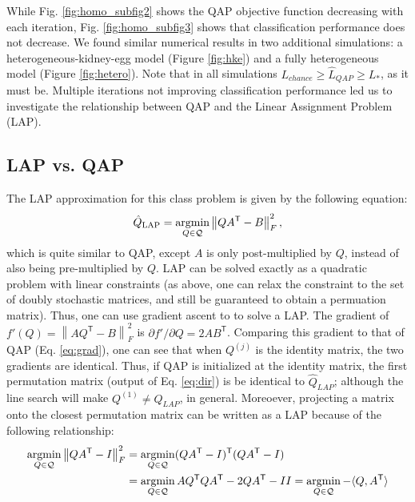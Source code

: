 \documentclass{article} %
\providecommand{\norm}[1]{\left \lVert#1 \right  \rVert}
\newcommand{\argmin}{\operatornamewithlimits{argmin}}
\newcommand{\T}{^{\ensuremath{\mathsf{T}}}}           %
\providecommand{\mc}[1]{\mathcal{#1}}
\providecommand{\mh}[1]{\hat{#1}}
\newcommand{\qapa}{\texttt{QAP}$_1$ }
\begin{document}

While Fig. \ref{fig:homo_subfig2} shows the QAP objective function decreasing with each iteration, Fig. \ref{fig:homo_subfig3} shows that classification performance does not decrease.  We found similar numerical results in two additional simulations: a heterogeneous-kidney-egg model (Figure \ref{fig:hke}) and a fully heterogeneous model (Figure \ref{fig:hetero}). Note that in all simulations $L_{chance} \geq \mh{L}_{QAP} \geq L_*$, as it must be.  Multiple iterations not improving classification performance led us to investigate the relationship between QAP and the Linear Assignment Problem (LAP).




\subsection{LAP vs. QAP} %
\label{sub:lap_vs_qap}

The LAP approximation for this class problem is given by the following equation:
\begin{align} \label{eq:LAP}
	\mh{Q}_{\text{LAP}} = \argmin_{Q \in \mc{Q}} \norm{QA\T - B }^2_F,
\end{align}
which is quite similar to QAP, except $A$ is only post-multiplied by $Q$, instead of also being pre-multiplied by $Q$. LAP can be solved exactly as a quadratic problem with linear constraints (as above, one can relax the constraint to the set of doubly stochastic matrices, and still be guaranteed to obtain a permuation matrix). Thus, one can use gradient ascent to to solve a LAP.  The gradient of $f'(Q)=\norm{AQ\T-B}_F^2$ is %
	$\partial f'/\partial Q = 2A B\T$. 
Comparing this gradient to that of QAP (Eq. \eqref{eq:grad}), one can see that when $Q^{(j)}$ is the identity matrix, the two gradients are identical.  Thus, if QAP is initialized at the identity matrix, the first permutation matrix (output of Eq. \eqref{eq:dir}) is be identical to $\mh{Q}_{LAP}$; although the line search will make $Q^{(1)} \neq \mh{Q}_{LAP}$, in general.  Moreoever, projecting a matrix onto the closest permutation matrix can be written as a LAP because of the following relationship:
\begin{align}
	\argmin_{Q \in \mc{Q}} \norm{QA\T - I}_F^2 &= \argmin_{Q \in \mc{Q}} (QA\T-I)\T (QA\T-I) 
\nonumber\\ &=\argmin_{Q \in \mc{Q}} AQ\T QA\T -2QA\T - II = \argmin_{Q \in \mc{Q}}  -\langle Q, A\T \rangle  
\end{align}
\end{document}
